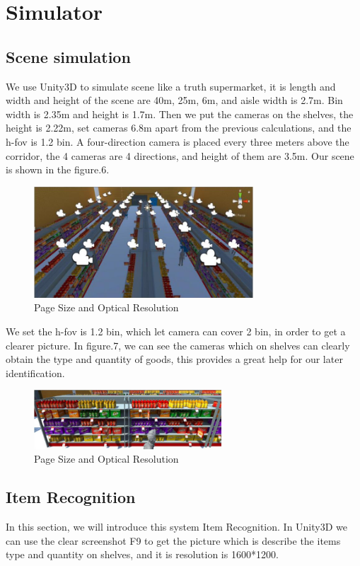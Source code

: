 \section{Simulator}


\subsection{Scene simulation}

We use Unity3D to simulate scene like a truth supermarket, it is length and width and height of the scene are 40m, 25m, 6m, and aisle width is 2.7m.
Bin width is 2.35m and height is 1.7m.
Then we put the cameras on the shelves, the height is 2.22m, set cameras 6.8m apart from the previous calculations, and the h-fov is 1.2 bin.
A four-direction camera is placed every three meters above the corridor, the 4 cameras are 4 directions, and height of them are 3.5m.
Our scene is shown in the figure.6.
\begin{figure}[htbp]
\centerline{\includegraphics[width=8.2cm,scale=0.9]{supermarket.jpg}}
\caption{Page Size and Optical Resolution}
\label{fig}
\end{figure}

We set the h-fov is 1.2 bin, which let camera can cover 2 bin, in order to get a clearer picture. In figure.7, we can see the cameras which on shelves can clearly obtain the type and quantity of goods, this provides a great help for our later identification.
\begin{figure}[htbp]
\centerline{\includegraphics[width=7cm,scale=0.8]{shelves.jpg}}
\caption{Page Size and Optical Resolution}
\label{fig}
\end{figure}

\subsection{Item Recognition}
In this section, we will introduce this system Item Recognition. In Unity3D we can use the clear screenshot F9 to get the picture which is describe the items type and quantity on shelves, and it is resolution is 1600*1200.

